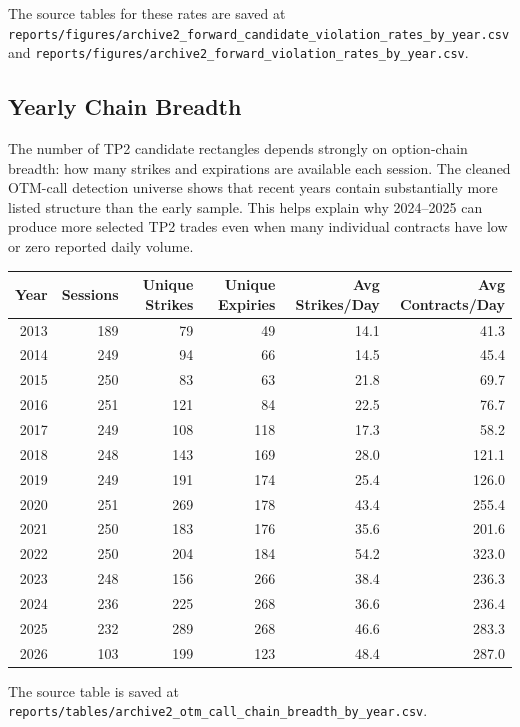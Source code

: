 \documentclass[11pt]{article}
\begin{document}
The source tables for these rates are saved at
\texttt{reports/figures/archive2\_forward\_candidate\_violation\_rates\_by\_year.csv}
and
\texttt{reports/figures/archive2\_forward\_violation\_rates\_by\_year.csv}.

\subsection*{Yearly Chain Breadth}

The number of TP2 candidate rectangles depends strongly on option-chain breadth:
how many strikes and expirations are available each session. The cleaned
OTM-call detection universe shows that recent years contain substantially more
listed structure than the early sample. This helps explain why 2024--2025 can
produce more selected TP2 trades even when many individual contracts have low
or zero reported daily volume.

\begin{center}
\begin{tabular}{rrrrrr}
\toprule
Year & Sessions & Unique Strikes & Unique Expiries & Avg Strikes/Day & Avg Contracts/Day \\
\midrule
2013 & 189 & 79 & 49 & 14.1 & 41.3 \\
2014 & 249 & 94 & 66 & 14.5 & 45.4 \\
2015 & 250 & 83 & 63 & 21.8 & 69.7 \\
2016 & 251 & 121 & 84 & 22.5 & 76.7 \\
2017 & 249 & 108 & 118 & 17.3 & 58.2 \\
2018 & 248 & 143 & 169 & 28.0 & 121.1 \\
2019 & 249 & 191 & 174 & 25.4 & 126.0 \\
2020 & 251 & 269 & 178 & 43.4 & 255.4 \\
2021 & 250 & 183 & 176 & 35.6 & 201.6 \\
2022 & 250 & 204 & 184 & 54.2 & 323.0 \\
2023 & 248 & 156 & 266 & 38.4 & 236.3 \\
2024 & 236 & 225 & 268 & 36.6 & 236.4 \\
2025 & 232 & 289 & 268 & 46.6 & 283.3 \\
2026 & 103 & 199 & 123 & 48.4 & 287.0 \\
\bottomrule
\end{tabular}
\end{center}

The source table is saved at
\texttt{reports/tables/archive2\_otm\_call\_chain\_breadth\_by\_year.csv}.
\end{document}

